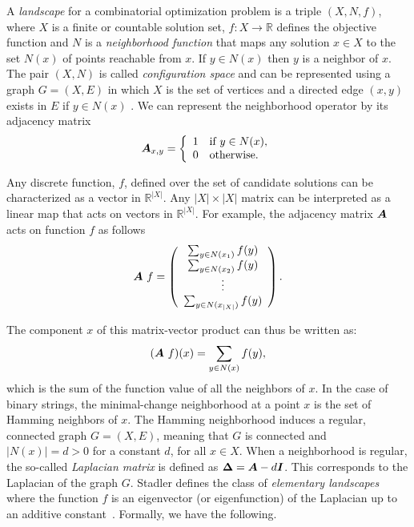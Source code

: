 \documentclass{article}
\def\vec#1{\mathchoice{\mbox{\boldmath$\displaystyle#1$}}
  {\mbox{\boldmath$\textstyle#1$}}
  {\mbox{\boldmath$\scriptstyle#1$}}
  {\mbox{\boldmath$\scriptscriptstyle#1$}}}
\begin{document}
A \emph{landscape} for a combinatorial optimization problem is a triple $(X,N,f)$, where $X$ is a finite or countable solution set, $f : X \rightarrow \mathbb{R}$ defines the objective function and $N$ is a \emph{neighborhood function} that maps any solution $x \in X$ to the set $N(x)$ of points reachable from $x$. If $y \in N(x)$ then $y$ is a neighbor of $x$.
The pair $(X,N)$ is called \emph{configuration space} and can be represented using a graph $G = (X,E)$ in which $X$ is the set of vertices and a directed edge $(x,y)$ exists in $E$ if $y \in N(x)$ \citep{Biyikoglu2007}.  We can represent the neighborhood operator by its adjacency matrix
\begin{equation}
\vec{A}_{x,y} = \left\{
\begin{array}{ll}
1 & \mbox{if $y \in N (x)$}, \\
0 & \mbox{otherwise.}
\end{array}
\right.
\end{equation}

Any discrete function, $f$, defined over the set of candidate solutions can be characterized as a vector in $\mathbb{R}^{|X|}$. Any $|X| \times |X|$ matrix can be interpreted as a linear map that acts on vectors in $\mathbb{R}^{|X|}$. For example, the adjacency matrix $\vec{A}$ acts on function $f$ as follows
\begin{equation}
\vec{A} ~ f = \left(
\begin{array}{c}
\sum_{y \in N(x_1)} f(y) \\
\sum_{y \in N(x_2)} f(y) \\
\vdots \\
\sum_{y \in N(x_{|X|})} f(y)
\end{array}
\right).
\end{equation}

The component $x$ of this matrix-vector product can thus be written
as:
\begin{equation}
\label{eqn:matrix-vector} (\vec{A} ~ f) (x) = \sum_{y \in N(x)} f(y),
\end{equation}
which is the sum of the function value of all the neighbors of $x$. In the case of binary strings, the minimal-change neighborhood at a point $x$ is the set of Hamming neighbors of $x$. The Hamming neighborhood induces a regular, connected graph $G =(X,E)$, meaning that $G$ is connected and $|N (x)| = d > 0$ for a constant $d$, for all $x \in X$. When a neighborhood is regular, the so-called \emph{Laplacian matrix} is defined as $\vec{\Delta} = \vec{A} - d \vec{I}$. This corresponds to the Laplacian of the graph $G$. Stadler defines the class of \emph{elementary landscapes} where the function $f$ is an eigenvector (or eigenfunction) of the Laplacian up to an additive constant~\citep{Stadler1995landscapes}. Formally, we have the following.
\end{document}
